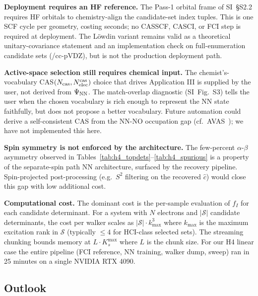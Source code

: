 \documentclass[journal=jctcce,manuscript=article,layout=traditional]{achemso}
\begin{document}
\textbf{Deployment requires an HF reference.}
The Pass-1 orbital frame of SI~\S S2.2
requires HF orbitals to chemistry-align the candidate-set index
tuples. This is one SCF cycle per geometry, costing seconds;
no CASSCF, CASCI, or FCI step is required at deployment. The
L\"owdin variant remains valid as a theoretical
unitary-covariance statement and an implementation check on
full-enumeration candidate sets (/cc-pVDZ), but is not the
production deployment path.

\textbf{Active-space selection still requires chemical input.}
The chemist's-vocabulary CAS$(N_{\rm cas}, N^{\rm cas}_{\rm elec})$
choice that drives Application III is supplied by the user, not
derived from $\Psi_{\rm NN}$. The match-overlap diagnostic
(SI~Fig.~S3) tells the user when the
chosen vocabulary is rich enough to represent the NN state
faithfully, but does not propose a better vocabulary. Future
automation could derive a self-consistent CAS from the NN-NO
occupation gap (cf.\ AVAS~\cite{Sayfutyarova2017AVAS}); we have
not implemented this here.

\textbf{Spin symmetry is not enforced by the architecture.}
The few-percent $\alpha$-$\beta$ asymmetry observed in
Tables~\ref{tab:h4_topdets}--\ref{tab:h4_spurious} is a property of the
separate-spin path NN architecture, surfaced by the recovery pipeline.
Spin-projected post-processing (e.g.\ $S^2$ filtering on the recovered
$\widehat{c}$) would close this gap with low additional cost.

\textbf{Computational cost.}
The dominant cost is the per-sample evaluation of $f_I$ for each
candidate determinant. For a system with $N$ electrons and
$|\mathcal{S}|$ candidate determinants, the cost per walker scales as
$|\mathcal{S}| \cdot k_{\max}^3$ where $k_{\max}$ is the maximum
excitation rank in $\mathcal{S}$ (typically $\le 4$ for HCI-class
selected sets). The streaming chunking bounds memory at
$L \cdot K_s^{\max}$ where $L$ is the chunk size. For our H4 linear
case the entire pipeline (FCI reference, NN training, walker dump,
sweep) ran in 25 minutes on a single NVIDIA RTX 4090.

\subsection{Outlook}
\end{document}
